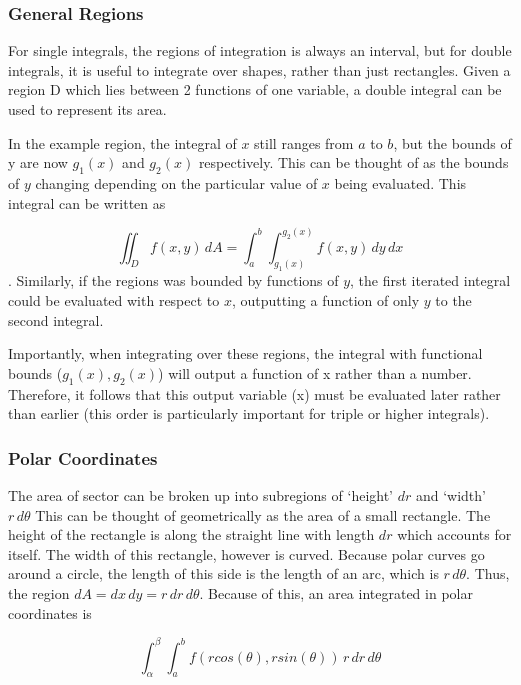 \documentclass{notes}
\begin{document}
\subsubsection*{General Regions}

For single integrals, the regions of integration is always an interval, but for double integrals, it is useful to integrate over shapes, rather than just rectangles. Given a region D which lies between 2 functions of one variable, a double integral can be used to represent its area.


In the example region, the integral of \(x\) still ranges from \(a\) to \(b\), but the bounds of y are now \(g_1(x)\) and \(g_2(x)\) respectively. This can be thought of as the bounds of \(y\) changing depending on the particular value of \(x\) being evaluated. This integral can be written as

\[\iint_D f(x, y)\, dA = \int_{a}^{b}\int_{g_1(x)}^{g_2(x)}f(x, y)\,dy \,dx\]. Similarly, if the regions was bounded by functions of \(y\), the first iterated integral could be evaluated with respect to \(x\), outputting a function of only \(y\) to the second integral.

Importantly, when integrating over these regions, the integral with functional bounds (\(g_1(x), g_2(x)\)) will output a function of x rather than a number. Therefore, it follows that this output variable (x) must be evaluated later rather than earlier (this order is particularly important for triple or higher integrals).

\subsubsection*{Polar Coordinates}

The area of sector can be broken up into subregions of `height' \(dr\) and `width' \(r \, d\theta\) This can be thought of geometrically as the area of a small rectangle. The height of the rectangle is along the straight line with length \(dr\) which accounts for itself. The width of this rectangle, however is curved. Because polar curves go around a circle, the length of this side is the length of an arc, which is \(r \, d\theta\). Thus, the region \(dA = dx \, dy = r \, dr \, d\theta\). Because of this, an area integrated in polar coordinates is

\[\int_{\alpha}^{\beta}\int_{a}^{b}f(rcos(\theta), rsin(\theta))\, r \, dr \, d\theta\]
\end{document}
